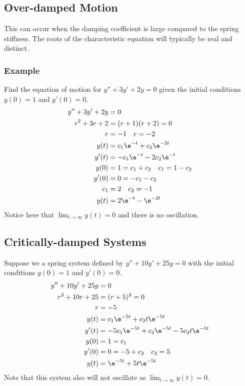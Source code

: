 \documentclass{math}
\begin{document}
\subsection*{Over-damped Motion}
This can occur when the damping coefficient is large compared to the spring
stiffness. The roots of the characteristic equation will typically be real
and distinct.

\subsubsection*{Example}
Find the equation of motion for \( y''+3y'+2y = 0 \) given the initial
conditions \( y(0) = 1 \) and \( y'(0) = 0 \).
\begin{align*}
  y''+3y'+2y &= 0 \\
  r^2+3r+2 &= (r+1)(r+2) = 0 \\
  r &= -1 \quad r = -2 \\
  y(t) &= c_1\e^{-t}+c_2\e^{-2t} \\
  y'(t) &= -c_1\e^{-t}-2c_2\e^{-t} \\
  y(0) &= 1 = c_1+c_2 \quad c_1 = 1-c_2 \\
  y'(0) &= 0 = -c_1-c_2 \\
  c_1 &= 2 \quad c_2 = -1 \\
  y(t) &= 2\e^{-t}-\e^{-2t}
\end{align*}
Notice here that \( \lim_{t\to\infty}y(t) = 0 \) and there is no oscillation.

\subsection*{Critically-damped Systems}
Suppose we a spring system defined by \( y''+10y'+25y = 0 \) with the initial
conditions \( y(0) = 1 \) and \( y'(0) = 0 \).
\begin{align*}
  y''+10y'+25y &= 0 \\
  r^2+10r+25 &= (r+5)^2 = 0 \\
  r &= -5 \\
  y(t) &= c_1\e^{-5t}+c_2t\e^{-5t} \\
  y'(t) &= -5c_1\e^{-5t}+c_2\e^{-5t}-5c_2t\e^{-5t} \\
  y(0) &= 1 = c_1 \\
  y'(0) &= 0 = -5+c_2 \quad c_2 = 5 \\
  y(t) &= \e^{-5t}+5t\e^{-5t}
\end{align*}
Note that this system also will not oscillate as \( \lim_{t\to\infty}y(t) =
0 \).
\end{document}
